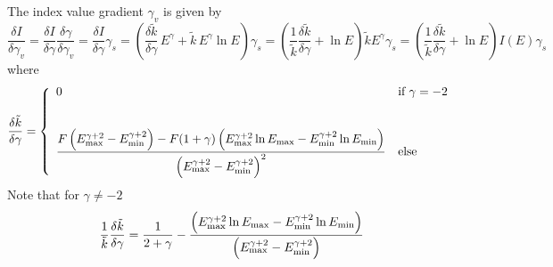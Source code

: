 \documentclass{article}[12pt,a4]
\begin{document}
The index value gradient $\gamma_v$ is given by
\begin{equation}
\frac{\delta I}{\delta \gamma_v} =
  \frac{\delta I}{\delta \gamma} \frac{\delta \gamma}{\delta \gamma_v} = 
  \frac{\delta I}{\delta \gamma} \gamma_s = 
  \left( \frac{\delta \tilde{k}}{\delta \gamma} \, E^{\gamma} + \tilde{k} \, E^{\gamma} \ln E \right)  \gamma_s =
  \left( \frac{1}{\tilde{k}} \frac{\delta \tilde{k}}{\delta \gamma} + \ln E \right) \tilde{k} E^{\gamma} \gamma_s =
  \left( \frac{1}{\tilde{k}} \frac{\delta \tilde{k}}{\delta \gamma} + \ln E \right) I(E) \gamma_s
\end{equation}
where
\begin{equation}
   \frac{\delta \tilde{k}}{\delta \gamma} = \left \{
   \begin{array}{l l}
     \displaystyle
     0 & \mbox{if $\gamma = -2$} \\
     \\
     \\
     \displaystyle
      \frac{F \left( E_{\rm max}^{\gamma+2}-E_{\rm min}^{\gamma+2} \right) -
              F (1+\gamma) \left( E_{\rm max}^{\gamma+2} \ln E_{\rm max} - 
                                      E_{\rm min}^{\gamma+2} \ln E_{\rm min} \right)}
              {\left( E_{\rm max}^{\gamma+2}-E_{\rm min}^{\gamma+2} \right)^2}
         & \mbox{else}
   \end{array}
   \right .
\end{equation}
Note that for $\gamma \ne -2$
\begin{equation}
\frac{1}{\tilde{k}} \frac{\delta \tilde{k}}{\delta \gamma} =
  \frac{1}{2+\gamma} -
  \frac{\left( E_{\rm max}^{\gamma+2} \ln E_{\rm max} - 
                    E_{\rm min}^{\gamma+2} \ln E_{\rm min} \right)}
          {\left( E_{\rm max}^{\gamma+2}-E_{\rm min}^{\gamma+2} \right)}
\end{equation}
\end{document}

